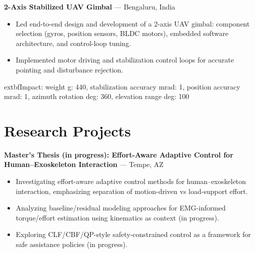 \documentclass[11pt]{article}
\begin{document}
\vspace{2pt}

\textbf{ 2-Axis Stabilized UAV Gimbal } --- Bengaluru, India\\

\begin{itemize}[leftmargin=*,noitemsep]
  
  \item Led end-to-end design and development of a 2-axis UAV gimbal: component selection (gyros, position sensors, BLDC motors), embedded software architecture, and control-loop tuning.
  
  \item Implemented motor driving and stabilization control loops for accurate pointing and disturbance rejection.
  
\end{itemize}


	extbf{Impact:} weight g: 440, stabilization accuracy mrad: 1, position accuracy mrad: 1, azimuth rotation deg: 360, elevation range deg: 100\\

\vspace{2pt}


\section*{ Research Projects }

\textbf{ Master's Thesis (in progress): Effort-Aware Adaptive Control for Human–Exoskeleton Interaction } --- Tempe, AZ\\

\begin{itemize}[leftmargin=*,noitemsep]
  
  \item Investigating effort-aware adaptive control methods for human–exoskeleton interaction, emphasizing separation of motion-driven vs load-support effort.
  
  \item Analyzing baseline/residual modeling approaches for EMG-informed torque/effort estimation using kinematics as context (in progress).
  
  \item Exploring CLF/CBF/QP-style safety-constrained control as a framework for safe assistance policies (in progress).
  
\end{itemize}


\vspace{2pt}
\end{document}
